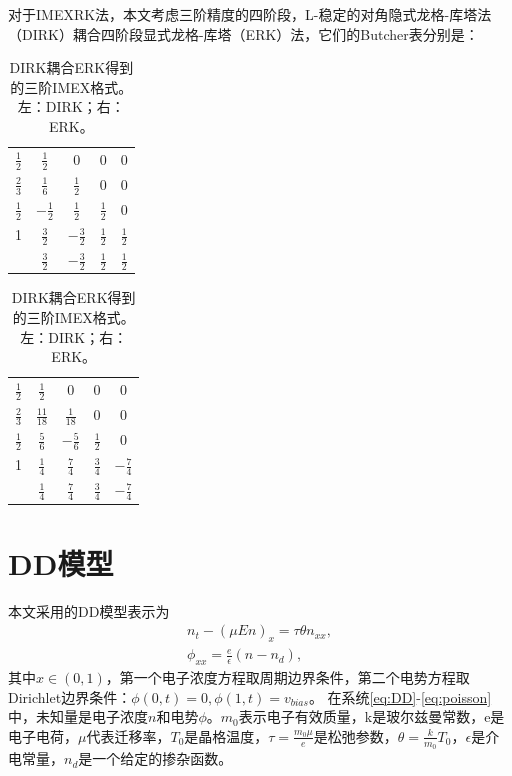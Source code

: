 对于IMEXRK法，本文考虑三阶精度的四阶段，L-稳定的对角隐式龙格-库塔法（DIRK）耦合四阶段显式龙格-库塔（ERK）法\cite{ascher1997implicitexplicita}，它们的Butcher表分别是：
\begin{table}
    \begin{minipage}{0.48\linewidth}
        \centering
        \begin{tabular}{c|cccc}
            $\frac{1}{2}$ & $\frac{1}{2}$  & 0              & 0             & 0             \\
            $\frac{2}{3}$ & $\frac{1}{6}$  & $\frac{1}{2}$  & 0             & 0             \\
            $\frac{1}{2}$ & $-\frac{1}{2}$ & $\frac{1}{2}$  & $\frac{1}{2}$ & 0             \\
            1             & $\frac{3}{2}$  & $-\frac{3}{2}$ & $\frac{1}{2}$ & $\frac{1}{2}$ \\
            \hline
                          & $\frac{3}{2}$  & $-\frac{3}{2}$ & $\frac{1}{2}$ & $\frac{1}{2}$
        \end{tabular}
        \label{tab:DIRK}
    \end{minipage}
    \begin{minipage}{0.48\linewidth}
        \centering
        \begin{tabular}{c|cccc}
            $\frac{1}{2}$ & $\frac{1}{2}$   & 0              & 0             & 0              \\
            $\frac{2}{3}$ & $\frac{11}{18}$ & $\frac{1}{18}$ & 0             & 0              \\
            $\frac{1}{2}$ & $\frac{5}{6}$   & $-\frac{5}{6}$ & $\frac{1}{2}$ & 0              \\
            1             & $\frac{1}{4}$   & $\frac{7}{4}$  & $\frac{3}{4}$ & $-\frac{7}{4}$ \\
            \hline
                          & $\frac{1}{4}$   & $\frac{7}{4}$  & $\frac{3}{4}$ & $-\frac{7}{4}$
        \end{tabular}
        \label{tab:ERK}
    \end{minipage}
    \caption{DIRK耦合ERK得到的三阶IMEX格式。左：DIRK；右：ERK。}
    \label{tab:IMEX3}
\end{table}

\section{DD模型}

本文采用的DD模型表示为
\begin{align}
    n_t - (\mu En)_x = \tau \theta n_{xx}, \label{eq:DD} \\
    \phi_{xx} = \frac{e}{\epsilon}(n - n_d),  \label{eq:poisson}
\end{align}
其中$x\in(0,1)$，第一个电子浓度方程取周期边界条件，第二个电势方程取Dirichlet边界条件：$\phi(0,t) = 0, \phi(1,t) = v_{bias}$。
在系统\eqref{eq:DD}-\eqref{eq:poisson}中，未知量是电子浓度$n$和电势$\phi$。$m_0$表示电子有效质量，k是玻尔兹曼常数，e是电子电荷，$\mu$代表迁移率，$T_0$是晶格温度，$\tau = \frac{m_0 \mu}{e}$是松弛参数，$\theta = \frac{k}{m_0}T_0$，$\epsilon$是介电常量，$n_d$是一个给定的掺杂函数。

